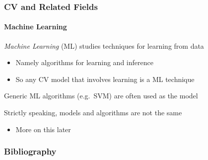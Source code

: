 \documentclass[xetex,professionalfont]{beamer}
\begin{document}
\begin{frame}
\frametitle{CV and Related Fields}
\framesubtitle{Machine Learning}

\emph{Machine Learning} (ML) studies techniques for learning from data
\begin{itemize}
    \item Namely algorithms for learning and inference
    \item So any CV model that involves learning is a ML technique
\end{itemize}

\bigskip
Generic ML algorithms (e.g.\ SVM) are often used as the model %

\bigskip
Strictly speaking, models and algorithms are not the same
\begin{itemize}
    \item More on this later
\end{itemize}

\end{frame}


\begin{frame}[allowframebreaks=0.9]
\frametitle{Bibliography}

\printbibliography

\end{frame}
\end{document}
